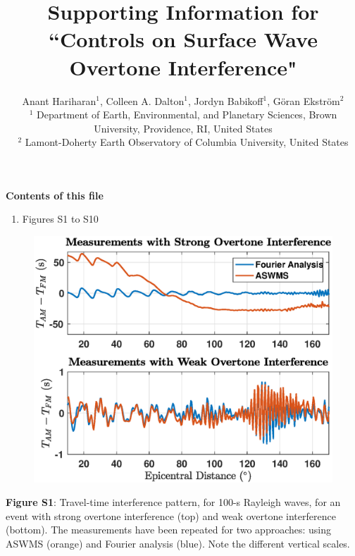 \documentclass[extra,mreferee]{gji}
\title{Supporting Information for \\ ``Controls on Surface Wave Overtone Interference"}
\author[Hariharan et al.]
  {Anant Hariharan$^1$, Colleen A. Dalton$^1$,  Jordyn Babikoff$^1$, G{\"o}ran Ekstr{\"o}m$^2$ \\
  $^1$ Department of Earth, Environmental, and Planetary Sciences, Brown University, Providence, RI, United States\\
  $^2$ Lamont-Doherty Earth Observatory of Columbia University, United States}
\begin{document}
\maketitle



\noindent\textbf{Contents of this file}
\begin{enumerate}
\item Figures S1 to S10
\end{enumerate}

\newpage
\begin{figure}
 \noindent\includegraphics[width=1\textwidth]{FigS1_VSver.eps} \end{figure} \textbf{Figure S1}: Travel-time interference pattern, for 100-s Rayleigh waves, for an event with strong overtone interference (top) and weak overtone interference (bottom). The measurements have been repeated for two approaches: using ASWMS (orange) and Fourier analysis (blue). Note the different vertical scales.
\end{document}
